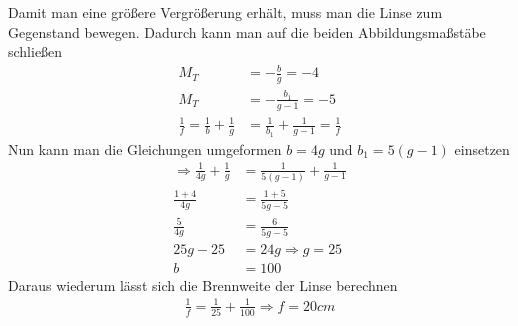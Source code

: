 \documentclass[12pt,a4paper,ngerman]{article}
\begin{document}
Damit man eine größere Vergrößerung erhält, muss man die Linse zum Gegenstand bewegen. Dadurch kann man auf die beiden Abbildungsmaßstäbe schließen
\begin{align*}
M_T &=-\frac{b}{g} = -4 \\
M_T &= -\frac{b_1}{g-1} = -5 \\
\frac{1}{f} = \frac{1}{b}+\frac{1}{g} &= \frac{1}{b_1}+\frac{1}{g-1} = \frac{1}{f}
\end{align*}
Nun kann man die Gleichungen umgeformen $b = 4g$ und $b_1 = 5(g-1)$  einsetzen
\begin{align*}
\Rightarrow \frac{1}{4g} + \frac{1}{g} &= \frac{1}{5(g-1)} + \frac{1}{g-1} \\
\frac{1+4}{4g} &= \frac{1+5}{5g-5} \\
\frac{5}{4g} &= \frac{6}{5g-5} \\
25g-25 &= 24g \Rightarrow g = 25 \\
b &= 100
\end{align*}
Daraus wiederum lässt sich die Brennweite der Linse berechnen
\begin{align*}
\frac{1}{f} = \frac{1}{25} + \frac{1}{100} \Rightarrow f = 20cm
\end{align*}

\pagebreak
\end{document}
